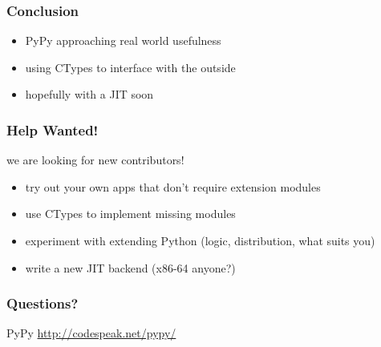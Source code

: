 \documentclass[utf8x]{beamer}
\begin{document}
\begin{frame}
  \frametitle{Conclusion}
  \begin{itemize}
  \item PyPy approaching real world usefulness
  \item using CTypes to interface with the outside
  \item hopefully with a JIT soon
  \end{itemize}
\end{frame}

\begin{frame}
  \frametitle{Help Wanted!}
  we are looking for new contributors!
  \begin{itemize}
  \item try out your own apps that don't require extension modules
  \item use CTypes to implement missing modules
  \item experiment with extending Python (logic, distribution, what suits you)
  \item write a new JIT backend (x86-64 anyone?)
  \end{itemize}
\end{frame}

\begin{frame}
  \frametitle{Questions?}
  \begin{block}{
    PyPy}
    \bigskip
    \hskip 1cm \url{http://codespeak.net/pypy/}
    \bigskip
  \end{block}
\end{frame}
\end{document}
